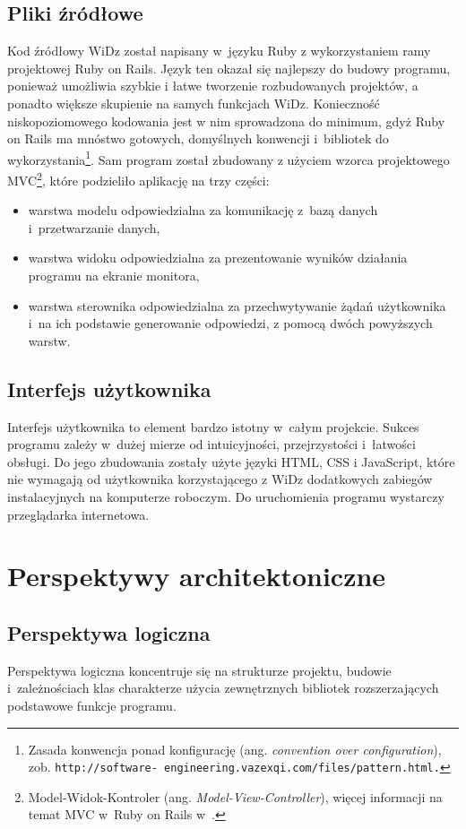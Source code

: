 \documentclass[12pt,leqno,twoside]{mwart}
\begin{document}
\subsection{Pliki źródłowe}
\noindent Kod źródłowy WiDz został napisany w~języku Ruby z wykorzystaniem ramy projektowej Ruby on Rails. Język ten okazał się najlepszy do budowy programu, ponieważ umożliwia szybkie i łatwe tworzenie rozbudowanych projektów, a ponadto większe skupienie na samych funkcjach WiDz. Konieczność niskopoziomowego kodowania jest w nim sprowadzona do minimum, gdyż Ruby on Rails ma mnóstwo gotowych, domyślnych konwencji i~bibliotek do wykorzystania\footnote{Zasada konwencja ponad konfigurację (ang. \textit{convention over configuration}), zob. \tt{http://software}\rm{-} \tt{engineering.vazexqi.com/files/pattern.html}.}. Sam program został zbudowany z użyciem wzorca projektowego MVC\footnote{Model-Widok-Kontroler (ang. \textit{Model-View-Controller}), więcej informacji na temat MVC w~Ruby on Rails w~\cite{SP}.}, które podzieliło aplikację na trzy części:
\begin{itemize}
\item warstwa modelu odpowiedzialna za komunikację z~bazą danych i~przetwarzanie danych,
\item warstwa widoku odpowiedzialna za prezentowanie wyników działania programu na ekranie monitora,
\item warstwa sterownika odpowiedzialna za przechwytywanie żądań użytkownika i~na ich podstawie generowanie odpowiedzi, z pomocą dwóch powyższych warstw.
\end{itemize}

\subsection{Interfejs użytkownika}
\noindent Interfejs użytkownika to element bardzo istotny w~całym projekcie. Sukces programu zależy w~dużej mierze od intuicyjności, przejrzystości i~łatwości obsługi. Do jego zbudowania zostały użyte języki HTML, CSS i JavaScript, które nie wymagają od użytkownika korzystającego z WiDz dodatkowych zabiegów instalacyjnych na komputerze roboczym. Do uruchomienia programu wystarczy przeglądarka internetowa.

\section{Perspektywy architektoniczne}
\subsection{Perspektywa logiczna}
\noindent Perspektywa logiczna koncentruje się na strukturze projektu, budowie i~zależnościach klas charakterze użycia zewnętrznych bibliotek rozszerzających podstawowe funkcje programu.%
\end{document}
